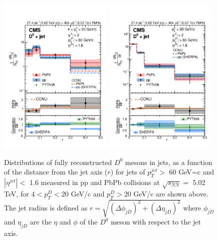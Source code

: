 \begin{figure}[hbtp]
\begin{center}
\includegraphics[width=0.48\textwidth]{Figures/Chapter2/CMSDJetLow.png}
\includegraphics[width=0.48\textwidth]{Figures/Chapter2/CMSDJetHigh.png}
\caption{Distributions of fully reconstructed $D^0$ mesons in jets, as a function of the distance from the jet axis ($r$) for jets of $p_T^{jet} >$ 60 GeV=c and $|\eta^{jet}| <$ 1.6 measured in pp and PbPb collisions at $\sqrt{s_{NN}} = $ 5.02 TeV, for $4 < p_T^D < 20$ GeV/c and $p_T^D > 20$ GeV/c are shown above. The jet radius is defined as $r = \sqrt{(\Delta \phi_{jD})^2 +  (\Delta \eta_{jD})^2 }$ where $\phi_{jD}$ and $\eta_{jD}$ are the $\eta$ and $\phi$ of the $D^0$ meson with respect to the jet axis.}
\label{DJETCorr}
\end{center}
\end{figure}   

